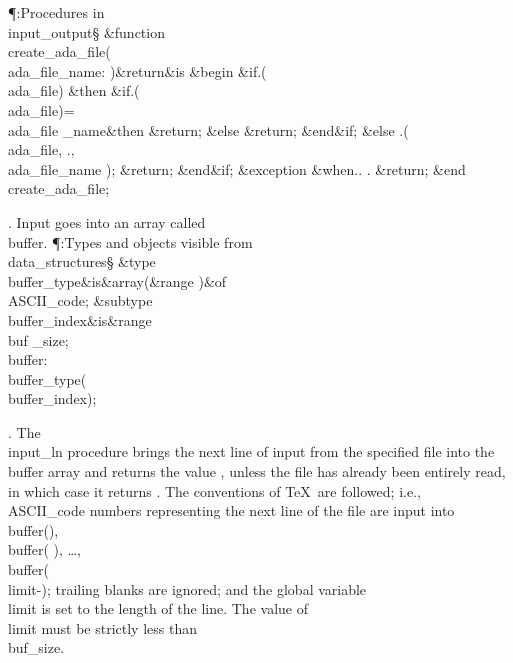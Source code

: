 \Y\P\?\4:Procedures in \\{input\_output}\X\mathrel{+}\S\?\6
\&{function}\8\1\\{create\_ada\_file}\?(\1\?\\{ada\_file\_name}\?:\?%
\?\2)\&{return}\?\8\2\8\&{is}\8\1\6
\4\&{begin}\6
\&{if}\1\1\8\?.\?\?\1(\?\\{ada\_file}\?\2)\?\2\8%
\&{then}\6
\&{if}\1\1\8\?.\?\?\1(\?\\{ada\_file}\?\2)=\?\\{ada\_file%
\_name}\2\8\&{then}\6
\?\&{return}\?\8;\6
\4\&{else}\6
\?\&{return}\?\8;\2\6
\&{end}\8\2\&{if}\1;\6
\4\&{else}\6
\?.\?\?\1(\?\?\KR\?\\{ada\_file}\?,\?%
\?\KR\?\?.\?\?,\?\?\KR\?\\{ada\_file\_name}%
\?\2)\?;\5
\?\&{return}\?\8;\2\6
\&{end}\8\2\&{if}\1;\6
\1\4\&{exception}\6
\4\&{when}\8\?.\?\?\mathrel{\.|}\?\?.%
\?\?\mathrel{\.|}\?\?.\?\KR\6
\?\&{return}\?\8;\2\6
\&{end}\8\\{create\_ada\_file};\par
\fi

. Input goes into an array called \\{buffer}.
\Y\P\?\4:Types and objects visible from \\{data\_structures}\X\mathrel{+}\S%
\?\6
\&{type}\8\\{buffer\_type}\8\&{is}\?\8\1\&{array}\8\1(\?\8\&{range}%
\?\8\BOX\2)\2\8\&{of}\?\8\\{ASCII\_code};\6
\&{subtype}\8\\{buffer\_index}\8\&{is}\8\8\&{range}\?\to\?\\{buf%
\_size};\6
\\{buffer}\?:\?\\{buffer\_type}\?\1(\?\\{buffer\_index}\?\2)\?;\par
\fi

. The \\{input\_ln} procedure brings the next line of input from the
specified
file into the \\{buffer} array and returns the value , unless the file
has already been entirely read, in which case it returns . The
conventions of \TeX\ are followed; i.e., \\{ASCII\_code} numbers representing
the next line of the file are input into \\{buffer}\?(\?)\?, \\{buffer}\?(%
\?)\?, \dots,
\\{buffer}\?(\?\\{limit}\?-\?)\?; trailing blanks are ignored;
and the global variable \\{limit} is set to the length of the
line. The value of \\{limit} must be strictly less than \\{buf\_size}.

